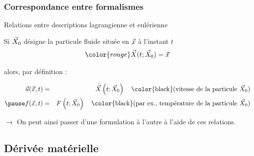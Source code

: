 \subsubsection{Correspondance entre formalismes}
\begin{frame}{Relations entre descriptions lagrangienne et eulérienne}

\small


Si $\vec{X}_0$ désigne la particule fluide située en $\vec{x}$ à l'instant $t$
\[
	\color{rouge}
	\myvec{X}(t; \myvec{X}_0) = \myvec{x}
\]

\pause

alors, par définition :

{\color{rouge}
\begin{eqnarray}
	\myvec{u}(\myvec{x}, t) & = & \dot{\myvec{X}}\left ( t; \myvec{X}_0 \right )
	\quad \mbox{\color{black}(vitesse de la particule $\myvec{X}_0$)}
	\\ \pause
	f(\myvec{x}, t) & = & F\left ( t; \myvec{X}_0 \right )
	\quad \mbox{\color{black}(par ex., température de la particule $\myvec{X}_0$)}
\end{eqnarray}
}

\bigskip

$\rightarrow$ On peut ainsi passer d'une formulation à l'autre à l'aide de ces relations.

\medskip

\vspace{20mm}

\end{frame}


\subsection{Dérivée matérielle}


